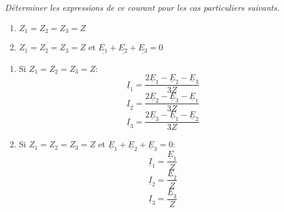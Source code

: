 \Question
{%
\textit{Déterminer les expressions de ce courant pour les cas particuliers suivants.}
\begin{enumerate}
\item $Z_{1}=Z_{2}=Z_{3}=Z$
\item $Z_{1}=Z_{2}=Z_{3}=Z$ et $\underline{E_{1}}+\underline{E_{2}}+\underline{E_{3}}=0$\\
\end{enumerate}
}
{%

\begin{enumerate}
\item Si $Z_{1}=Z_{2}=Z_{3}=Z$:
$$\underline{I}_{1}=\frac{2\underline{E}_{1}-\underline{E}_{2}-\underline{E}_{3}}{3Z}$$
$$\underline{I}_{2}=\frac{2\underline{E}_{2}-\underline{E}_{3}-\underline{E}_{1}}{3Z}$$
$$\underline{I}_{3}=\frac{2\underline{E}_{3}-\underline{E}_{1}-\underline{E}_{2}}{3Z}$$

\item Si $Z_{1}=Z_{2}=Z_{3}=Z$ et $\underline{E}_{1}+\underline{E}_{2}+\underline{E}_{3}=0$:
$$\underline{I}_{1}=\frac{\underline{E}_{1}}{Z}$$
$$\underline{I}_{2}=\frac{\underline{E}_{2}}{Z}$$
$$\underline{I}_{3}=\frac{\underline{E}_{3}}{Z}$$
\end{enumerate}
}
{%
}


